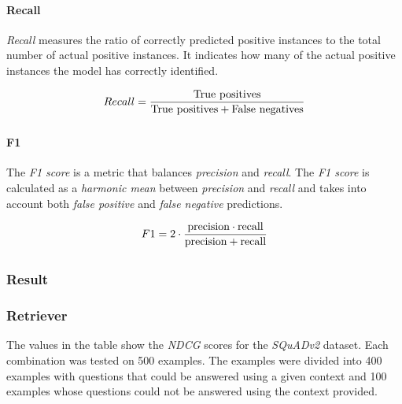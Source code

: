 \documentclass{article}
\begin{document}
\paragraph{Recall}
\textit{Recall} measures the ratio of correctly predicted positive instances to the total number of actual positive instances. It indicates how many of the actual positive instances the model has correctly identified.

\begin{align}
\begin{split}
	Recall &= \frac{\text{True positives}}{\text{True positives} + \text{False negatives}}\\[0.25\baselineskip]
\end{split}
\end{align}

\paragraph{F1}
The \textit{F1 score} is a metric that balances \textit{precision} and \textit{recall}. The \textit{F1 score} is calculated as a \textit{harmonic mean} between \textit{precision} and \textit{recall} and takes into account both \textit{false positive} and \textit{false negative} predictions.

\begin{align}
\begin{split}
	F1 &= 2\cdot \frac{\text{precision}\cdot\text{recall}}{\text{precision} + \text{recall}}\\[0.25\baselineskip]
\end{split}
\end{align}

\subsubsection{Result}

\subsubsection*{Retriever}
The values in the table show the \textit{NDCG} scores for the \textit{SQuADv2} dataset. Each combination was tested on 500 examples. The examples were divided into 400 examples with questions that could be answered using a given context and 100 examples whose questions could not be answered using the context provided.
\end{document}
